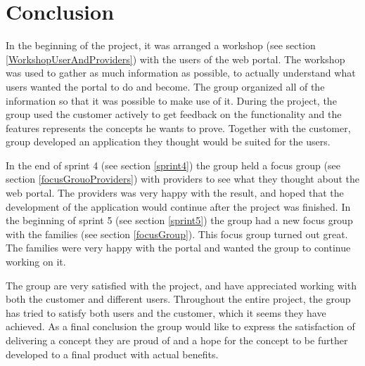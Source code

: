\section{Conclusion}
In the beginning of the project, it was arranged a workshop (see section \ref{WorkshopUserAndProviders}) with the users of the web portal. The workshop was used to gather as much information as possible, to actually understand what users wanted the portal to do and become. The group organized all of the information so that it was possible to make use of it. During the project, the group used the customer actively to get feedback on the functionality and the features represents the concepts he wants to prove. Together with the customer, group developed an application they thought would be suited for the users. 

In the end of sprint 4 (see section \ref{sprint4}) the group held a focus group (see section \ref{focusGrouoProviders}) with providers to see what they thought about the web portal. The providers was very happy with the result, and hoped that the development of the application would continue after the project was finished. In the beginning of sprint 5 (see section \ref{sprint5}) the group had a new focus group with the families (see section \ref{focusGroup}). This focus group turned out great. The families were very happy with the portal and wanted the group to continue working on it. 

The group are very satisfied with the project, and have appreciated working with both the customer and different users. Throughout the entire project, the group has tried to satisfy both users and the customer, which it seems they have achieved. As a final conclusion the group would like to express the satisfaction of delivering a concept they are proud of and a hope for the concept to be further developed to a final product with actual benefits.



\cleardoublepage